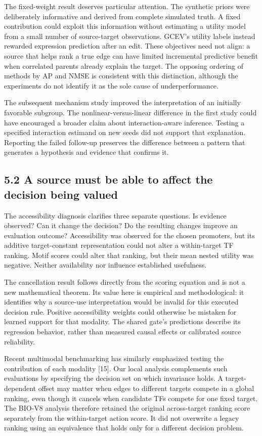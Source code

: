 \documentclass[
  11pt,
]{article}
\begin{document}
The fixed-weight result deserves particular attention. The synthetic
priors were deliberately informative and derived from complete simulated
truth. A fixed contribution could exploit this information without
estimating a utility model from a small number of source-target
observations. GCEV's utility labels instead rewarded expression
prediction after an edit. These objectives need not align: a source that
helps rank a true edge can have limited incremental predictive benefit
when correlated parents already explain the target. The opposing
ordering of methods by AP and NMSE is consistent with this distinction,
although the experiments do not identify it as the sole cause of
underperformance.

The subsequent mechanism study improved the interpretation of an
initially favorable subgroup. The nonlinear-versus-linear difference in
the first study could have encouraged a broader claim about
interaction-aware inference. Testing a specified interaction estimand on
new seeds did not support that explanation. Reporting the failed
follow-up preserves the difference between a pattern that generates a
hypothesis and evidence that confirms it.

\subsection{5.2 A source must be able to affect the decision being
valued}\label{a-source-must-be-able-to-affect-the-decision-being-valued}

The accessibility diagnosis clarifies three separate questions. Is
evidence observed? Can it change the decision? Do the resulting changes
improve an evaluation outcome? Accessibility was observed for the chosen
promoters, but its additive target-constant representation could not
alter a within-target TF ranking. Motif scores could alter that ranking,
but their mean nested utility was negative. Neither availability nor
influence established usefulness.

The cancellation result follows directly from the scoring equation and
is not a new mathematical theorem. Its value here is empirical and
methodological: it identifies why a source-use interpretation would be
invalid for this executed decision rule. Positive accessibility weights
could otherwise be mistaken for learned support for that modality. The
shared gate's predictions describe its regression behavior, rather than
measured causal effects or calibrated source reliability.

Recent multimodal benchmarking has similarly emphasized testing the
contribution of each modality {[}15{]}. Our local analysis complements
such evaluations by specifying the decision set on which invariance
holds. A target-dependent offset may matter when edges to different
targets compete in a global ranking, even though it cancels when
candidate TFs compete for one fixed target. The BIO-V8 analysis
therefore retained the original across-target ranking score separately
from the within-target action score. It did not overwrite a legacy
ranking using an equivalence that holds only for a different decision
problem.
\end{document}
